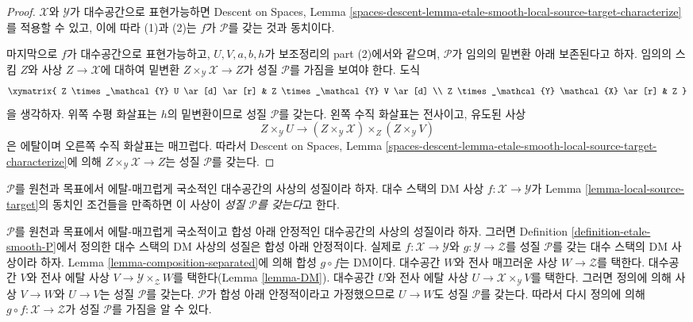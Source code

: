 \begin{proof}
\medskip\noindent
$\mathcal{X}$와 $\mathcal{Y}$가 대수공간으로 표현가능하면 Descent on Spaces,
Lemma \ref{spaces-descent-lemma-etale-smooth-local-source-target-characterize}를
적용할 수 있고, 이에 따라 (1)과 (2)는 $f$가 $\mathcal{P}$를 갖는 것과
동치이다.

\medskip\noindent
마지막으로 $f$가 대수공간으로 표현가능하고, $U, V, a, b, h$가 보조정리의
part (2)에서와 같으며, $\mathcal{P}$가 임의의 밑변환 아래 보존된다고 하자.
임의의 스킴 $Z$와 사상 $Z \to \mathcal{X}$에 대하여 밑변환
$Z \times_\mathcal{Y} \mathcal{X} \to Z$가 성질 $\mathcal{P}$를 가짐을
보여야 한다. 도식
$$
\xymatrix{
Z \times_\mathcal{Y} U \ar[d] \ar[r] &
Z \times_\mathcal{Y} V \ar[d] \\
Z \times_\mathcal{Y} \mathcal{X} \ar[r] &
Z
}
$$
을 생각하자. 위쪽 수평 화살표는 $h$의 밑변환이므로 성질 $\mathcal{P}$를
갖는다. 왼쪽 수직 화살표는 전사이고, 유도된 사상
$$
Z \times_\mathcal{Y} U \longrightarrow
(Z \times_\mathcal{Y} \mathcal{X}) \times_Z (Z \times_\mathcal{Y} V)
$$
은 에탈이며 오른쪽 수직 화살표는 매끄럽다. 따라서 Descent on Spaces,
Lemma \ref{spaces-descent-lemma-etale-smooth-local-source-target-characterize}에
의해 $Z \times_\mathcal{Y} \mathcal{X} \to Z$는 성질 $\mathcal{P}$를
갖는다.
\end{proof}

\begin{definition}
\label{definition-etale-smooth-P}
$\mathcal{P}$를 원천과 목표에서 에탈-매끄럽게 국소적인 대수공간의 사상의
성질이라 하자. 대수 스택의 DM 사상
$f : \mathcal{X} \to \mathcal{Y}$가 Lemma
\ref{lemma-local-source-target}의 동치인 조건들을 만족하면 이 사상이
{\it 성질 $\mathcal{P}$를 갖는다}고 한다.
\end{definition}

\begin{remark}
\label{remark-etale-smooth-composition}
$\mathcal{P}$를 원천과 목표에서 에탈-매끄럽게 국소적이고 합성 아래
안정적인 대수공간의 사상의 성질이라 하자. 그러면 Definition
\ref{definition-etale-smooth-P}에서 정의한 대수 스택의 DM 사상의 성질은
합성 아래 안정적이다. 실제로
$f : \mathcal{X} \to \mathcal{Y}$와
$g : \mathcal{Y} \to \mathcal{Z}$를 성질 $\mathcal{P}$를 갖는 대수
스택의 DM 사상이라 하자. Lemma \ref{lemma-composition-separated}에 의해
합성 $g \circ f$는 DM이다. 대수공간 $W$와 전사 매끄러운 사상
$W \to \mathcal{Z}$를 택한다. 대수공간 $V$와 전사 에탈 사상
$V \to \mathcal{Y} \times_\mathcal{Z} W$를 택한다(Lemma
\ref{lemma-DM}). 대수공간 $U$와 전사 에탈 사상
$U \to \mathcal{X} \times_\mathcal{Y} V$를 택한다. 그러면 정의에 의해
사상 $V \to W$와 $U \to V$는 성질 $\mathcal{P}$를 갖는다.
$\mathcal{P}$가 합성 아래 안정적이라고 가정했으므로 $U \to W$도 성질
$\mathcal{P}$를 갖는다. 따라서 다시 정의에 의해
$g \circ f : \mathcal{X} \to \mathcal{Z}$가 성질 $\mathcal{P}$를
가짐을 알 수 있다.
\end{remark}

